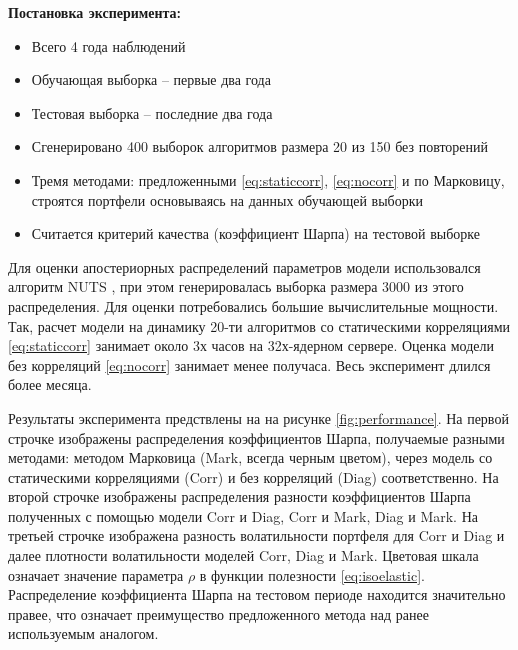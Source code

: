 \textbf{Постановка эксперимента:}
\begin{itemize}
	\item Всего 4 года наблюдений
	\item Обучающая выборка -- первые два года
	\item Тестовая выборка -- последние два года
	\item Сгенерировано 400 выборок алгоритмов размера 20 из 150 без повторений
	\item Тремя методами: предложенными \eqref{eq:staticcorr}, \eqref{eq:nocorr} и по Марковицу, строятся портфели основываясь на данных обучающей выборки
	\item Считается критерий качества (коэффициент Шарпа) на тестовой выборке
\end{itemize}

Для оценки апостериорных распределений параметров модели использовался алгоритм NUTS \citep{hoffman2011nuts}, при этом генерировалась выборка размера 3000 из этого распределения. Для оценки потребовались большие вычислительные мощности. Так, расчет модели на динамику 20-ти алгоритмов со статическими корреляциями \eqref{eq:staticcorr} занимает около 3х часов на 32х-ядерном сервере. Оценка модели без корреляций \eqref{eq:nocorr} занимает менее получаса. Весь эксперимент длился более месяца.

Результаты эксперимента предствлены на на рисунке \ref{fig:performance}. На первой строчке изображены распределения коэффициентов Шарпа, получаемые разными методами: методом Марковица (Mark, всегда черным цветом), через модель со статическими корреляциями (Corr) и без корреляций (Diag) соответственно. На второй строчке изображены распределения разности коэффициентов Шарпа полученных с помощью модели Corr и Diag, Corr и Mark, Diag и Mark. На третьей строчке изображена разность волатильности портфеля для Corr и Diag и далее плотности волатильности моделей Corr, Diag и Mark. Цветовая шкала означает значение параметра $\rho$ в функции полезности \eqref{eq:isoelastic}. Распределение коэффициента Шарпа на тестовом периоде находится значительно правее, что означает преимущество предложенного метода над ранее используемым аналогом. 


